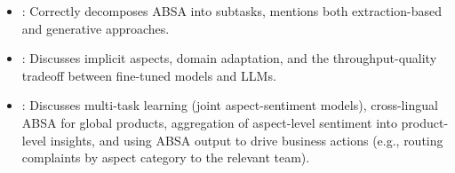 \begin{interviewq}
\goodgreat
\begin{itemize}
    \item {}: Correctly decomposes ABSA into subtasks, mentions both
    extraction-based and generative approaches.
    \item {}: Discusses implicit aspects, domain adaptation, and the
    throughput-quality tradeoff between fine-tuned models and LLMs.
    \item {}: Discusses multi-task learning (joint aspect-sentiment models),
    cross-lingual ABSA for global products, aggregation of aspect-level sentiment into
    product-level insights, and using ABSA output to drive business actions (e.g., routing
    complaints by aspect category to the relevant team).
\end{itemize}

\end{interviewq}

\vspace{0.5em}

